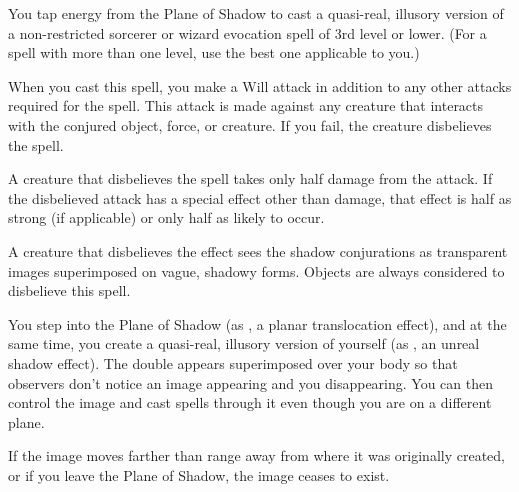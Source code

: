 \begin{spelleffect}
    You tap energy from the Plane of Shadow to cast a quasi-real, illusory version of a non-restricted sorcerer or wizard evocation spell of 3rd level or lower. (For a spell with more than one level, use the best one applicable to you.)
    \par When you cast this spell, you make a Will attack in addition to any other attacks required for the spell. This attack is made against any creature that interacts with the conjured object, force, or creature. If you fail, the creature disbelieves the spell.
    \par A creature that disbelieves the spell takes only half damage from the attack. If the disbelieved attack has a special effect other than damage, that effect is half as strong (if applicable) or only half as likely to occur.
\end{spelleffect}
\begin{spellnotes}
    A creature that disbelieves the effect sees the shadow conjurations as transparent images superimposed on vague, shadowy forms. Objects are always considered to disbelieve this spell.
\end{spellnotes}

\spelldur{\durmed}
\begin{spelleffect}
    You step into the Plane of Shadow (as , a planar translocation effect), and at the same time, you create a quasi-real, illusory version of yourself (as , an unreal shadow effect). The double appears superimposed over your body so that observers don't notice an image appearing and you disappearing. You can then control the image and cast spells through it even though you are on a different plane.
\end{spelleffect}
\begin{spellnotes}
    If the image moves farther than \rngfar range away from where it was originally created, or if you leave the Plane of Shadow, the image ceases to exist.
\end{spellnotes}

